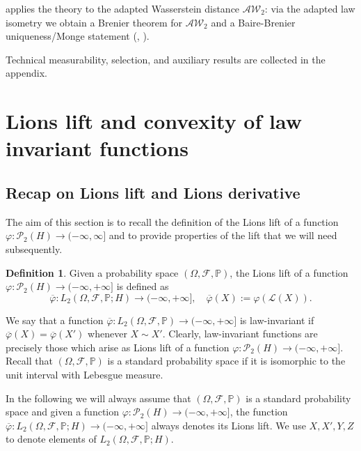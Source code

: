 \documentclass[a4paper]{amsart}
\numberwithin{theorem}{section}
\theoremstyle{definition}
\newtheorem{definition}[theorem]{Definition}
\newcommand{\F}{\mathcal{F}}
\newcommand{\law}{\mathcal{L}}
\newcommand{\AW}{\mathcal{AW}}
\newcommand{\Pc}{\mathcal P}
\renewcommand{\P}{\mathbb{P}}
\renewcommand{\H}{H}
\renewcommand{\phi}{\varphi}
\begin{document}
 applies the theory to the adapted Wasserstein distance $\AW_2$: via the adapted law isometry we obtain a Brenier theorem for $\AW_2$ and a Baire-Brenier uniqueness/Monge statement (, ).

Technical measurability, selection, and auxiliary results are collected in the appendix.

\tableofcontents


\section{Lions lift and convexity of law invariant functions} \label{sec:LionsRecap}

\subsection{Recap on Lions lift and Lions derivative}

The aim of this section is to recall the definition of the Lions lift of a function $\phi : \Pc_2(\H) \to (-\infty, \infty]$ and to provide properties of the lift that we will need subsequently.
\begin{definition}

Given a probability space $(\Omega,\F,\P)$,
the Lions lift of a function $\phi : \Pc_2(\H) \to (-\infty, +\infty]$ is defined as 
\[
\overline{\phi} : L_2(\Omega,\F,\P;\H) \to (-\infty, +\infty] , \quad \overline{\phi}(X) := \phi(\law(X)).
\]
\end{definition}
We say that a function $\overline{\phi} : L_2(\Omega,\F,\P) \to (-\infty , +\infty]$ is law-invariant if $\overline{\phi}(X) = \overline{\phi}(X')$ whenever $X \sim X'$. Clearly, law-invariant functions are precisely those which arise as Lions lift of a function  $\phi : \Pc_2(\H) \to (-\infty, +\infty]$. Recall that $(\Omega,\F,\P)$ is a standard probability space if it is isomorphic to the unit interval with Lebesgue measure.

\begin{tcolorbox}
In the following we will always assume that $(\Omega,\F,\P)$ is a standard probability space and given a function $\phi : \Pc_2(\H) \to (-\infty, +\infty]$, the function $\overline{\phi} : L_2(\Omega,\F,\P;\H) \to (-\infty, +\infty]$ always denotes its Lions lift. We use $X,X', Y,Z$ to denote elements of $L_2(\Omega, \F, \P;\H)$.
\end{tcolorbox}
 
 
\end{document}

